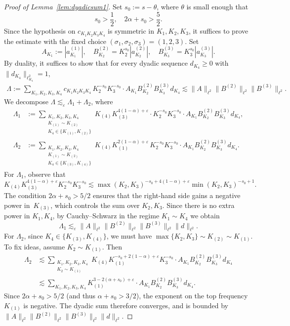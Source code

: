 \documentclass[11pt,reqno,english]{amsart}
\numberwithin{equation}{section}
\theoremstyle{plain}
\theoremstyle{definition}
\theoremstyle{remark}
\renewcommand{\epsilon}{\varepsilon}
\begin{document}
\begin{proof}[Proof of Lemma~\ref{lem:dyadicsum1}]
	Set $s_0:=s-\theta$, where $\theta$ is small enough that
	\[
	s_0>\frac{1}{2},\quad 2\alpha+s_0>\frac{5}{2}.
	\]
	Since the hypothesis on $c_{K_1 K_2 K_3 K_4}$ is symmetric in $K_1,K_2,K_3$, it suffices to prove the estimate with the fixed choice $(\sigma_1,\sigma_2,\sigma_3)=(1,2,3)$.
	Set
	\[
	A_{K_1}:=|a_{K_1}^{(1)}|,\quad B_{K_2}^{(2)}=K_2^{s_0}|a_{K_2}^{(2)}|,\quad B_{K_3}^{(3)}=K_3^{s_0}|a_{K_3}^{(3)}|.
	\]
	By duality, it suffices to show that for every dyadic sequence $d_{K_4}\geq 0$ with $\|d_{K_4}\|_{\ell_{K_4}^2}=1$,
	\begin{align*}
		\Lambda:=\sum_{K_1,K_2,K_3,K_4}c_{K_1 K_2 K_3 K_4}\, K_2^{-s_0}K_3^{-s_0}\cdot A_{K_1}B_{K_2}^{(2)}B_{K_3}^{(3)}d_{K_4}\lesssim \|A\|_{\ell^2}\|B^{(2)}\|_{\ell^2}\|B^{(3)}\|_{\ell^2}.
	\end{align*}
	We decompose $\Lambda\lesssim_{\epsilon} \Lambda_{1}+\Lambda_2$, where
	\begin{align*}
		\Lambda_1&:=\sum_{\substack{K_1,K_2,K_3,K_4\\
				K_{(1)}\sim K_{(2)}\\
				K_4\in \{K_{(1)},K_{(2)}\}
		}}
		K_{(4)}K_{(3)}^{4(1-\alpha)+\epsilon}
		\cdot
		K_2^{-s_0}K_3^{-s_0}\cdot A_{K_1}B_{K_2}^{(2)}B_{K_3}^{(3)}d_{K_4},\\
		\Lambda_2&:=\sum_{\substack{K_1,K_2,K_3,K_4\\
				K_{(1)}\sim K_{(2)}\\
				K_4\in \{K_{(3)},K_{(4)}\}
		}}
		K_{(4)}K_{(1)}^{2(1-\alpha)+\epsilon}\, K_2^{-s_0}K_3^{-s_0}\cdot A_{K_1}B_{K_2}^{(2)}B_{K_3}^{(3)}d_{K_4}.
	\end{align*}
	For $\Lambda_1$, observe that
	\[
	K_{(4)}
	K_{(3)}^{4(1-\alpha)+\epsilon}
	K_{2}^{-s_0}K_3^{-s_0}\lesssim \max(K_2,K_3)^{-s_0+4(1-\alpha)+\epsilon}\min(K_2,K_3)^{-s_0+1}.
	\]
	The condition $2\alpha+s_0>5/2$ ensures that the right-hand side gains a negative power in~$K_{(3)}$, which controls the sum over $K_2,K_3$.
	Since there is no extra power in $K_1,K_4$, by Cauchy--Schwarz in the regime $K_1\sim K_4$ we obtain
	\[
	\Lambda_1\lesssim_{\epsilon}\|A\|_{\ell^2}\|B^{(2)}\|_{\ell^2}\|B^{(3)}\|_{\ell^2}\|d\|_{\ell^2}.
	\]
	For $\Lambda_2$, since $K_4\in\{K_{(3)},K_{(4)}\}$, we must have $\max\{K_2,K_3\}\sim K_{(2)}\sim K_{(1)}$. To fix ideas, assume $K_2\sim K_{(1)}$. Then
	\begin{align*}
		\Lambda_2&\lesssim \sum_{\substack{K_1,K_2,K_3,K_4\\
				K_{2}\sim K_{(1)}
		}} K_{(4)}K_{(1)}^{-s_0+2(1-\alpha)+\epsilon}K_{3}^{-s_0}\cdot A_{K_1}B_{K_2}^{(2)}B_{K_3}^{(3)}d_{K_4}\\
		&\lesssim \sum_{K_1,K_2,K_3,K_4}
		K_{(1)}^{3-2(\alpha+s_0)+\epsilon}\cdot A_{K_1}B_{K_2}^{(2)}B_{K_3}^{(3)}d_{K_4}.
	\end{align*}
	Since $2\alpha+s_0>5/2$ (and thus $\alpha+s_0>3/2$), the exponent on the top frequency~$K_{(1)}$ is negative. The dyadic sum therefore converges, and is bounded by $\|A\|_{\ell^2}\|B^{(2)}\|_{\ell^2}\|B^{(3)}\|_{\ell^2}\|d\|_{\ell^2}$.
\end{proof}
	
\end{document}
